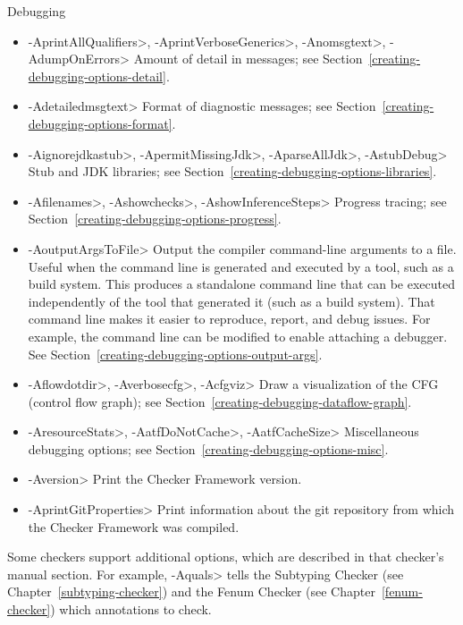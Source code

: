 Debugging
\begin{itemize}
\item
 \<-AprintAllQualifiers>,
 \<-AprintVerboseGenerics>,
 \<-Anomsgtext>,
 \<-AdumpOnErrors>
Amount of detail in messages; see Section~\ref{creating-debugging-options-detail}.

\item
 \<-Adetailedmsgtext>
Format of diagnostic messages; see Section~\ref{creating-debugging-options-format}.

\item
 \<-Aignorejdkastub>,
 \<-ApermitMissingJdk>,
 \<-AparseAllJdk>,
 \<-AstubDebug>
Stub and JDK libraries; see Section~\ref{creating-debugging-options-libraries}.

\item
 \<-Afilenames>,
 \<-Ashowchecks>,
 \<-AshowInferenceSteps>
Progress tracing; see Section~\ref{creating-debugging-options-progress}.

\item
\<-AoutputArgsToFile>
Output the compiler command-line arguments to a file.  Useful when the
command line is generated and executed by a tool, such as a build system.
This produces a standalone command line that can be executed independently
of the tool that generated it (such as a build system).
That command line makes it easier to reproduce, report, and debug issues.
For example, the command line can be modified to enable attaching a debugger.
See Section~\ref{creating-debugging-options-output-args}.

\item
 \<-Aflowdotdir>,
 \<-Averbosecfg>,
 \<-Acfgviz>
 Draw a visualization of the CFG (control flow graph); see
 Section~\ref{creating-debugging-dataflow-graph}.

\item
 \<-AresourceStats>,
 \<-AatfDoNotCache>,
 \<-AatfCacheSize>
Miscellaneous debugging options; see Section~\ref{creating-debugging-options-misc}.

\item
 \<-Aversion>
Print the Checker Framework version.

\item
 \<-AprintGitProperties>
Print information about the git repository from which the Checker Framework
was compiled.

\end{itemize}


\noindent
Some checkers support additional options, which are described in that
checker's manual section.
For example, \<-Aquals> tells
the Subtyping Checker (see Chapter~\ref{subtyping-checker}) and the Fenum Checker
(see Chapter~\ref{fenum-checker}) which annotations to check.


